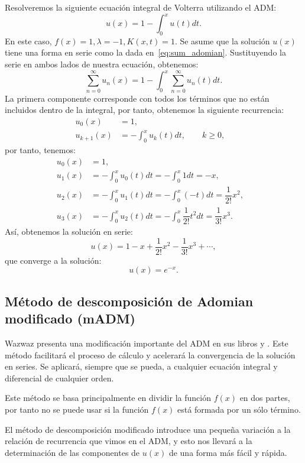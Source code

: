 \begin{ejemplo}
	Resolveremos la siguiente ecuación integral de Volterra utilizando el ADM:
	\begin{equation}
		u(x) = 1 - \int_{0}^{x} u(t)dt.
	\end{equation}
	En este caso, $f(x) = 1, \lambda = -1, K(x,t) = 1.$ Se asume que la solución $u(x)$ tiene una forma en serie como la dada en~\eqref{eq:sum_adomian}. Sustituyendo la serie en ambos lados de nuestra ecuación, obtenemos:
	\begin{equation}
		\sum_{n=0}^{\infty} u_n(x) = 1 - \int_{0}^{x} \sum_{n=0}^{\infty} u_n(t)dt.
	\end{equation}
	La primera componente corresponde con todos los términos que no están incluidos dentro de la integral, por tanto, obtenemos la siguiente recurrencia:
	\begin{align}
		u_0(x) &= 1,      &   \\
		u_{k+1}(x) &= - \int_{0}^{x} u_k(t)dt, \qquad k \geqslant 0,         & 
	\end{align}
	por tanto, tenemos:
	\begin{align}
		u_0(x) &= 1,      &   \\
		u_{1}(x) &= - \int_{0}^{x} u_0(t)dt = -\int_{0}^{x} 1dt = -x,    &  \\
		u_{2}(x) &= - \int_{0}^{x} u_1(t)dt = -\int_{0}^{x} (-t)dt = \dfrac{1}{2!}x^2,    &  \\
		u_{3}(x) &= - \int_{0}^{x} u_2(t)dt = -\int_{0}^{x} \dfrac{1}{2!}t^2dt = \dfrac{1}{3!}x^3.    & 
	\end{align}	
	Así, obtenemos la solución en serie:
	\begin{equation}
		u(x) = 1 - x + \dfrac{1}{2!}x^2 - \dfrac{1}{3!}x^3 + \cdots,
	\end{equation}
	que converge a la solución:
	\begin{equation}
		u(x) = e^{-x}.
	\end{equation}
\end{ejemplo}

\subsection{Método de descomposición de Adomian modificado (mADM)}
Wazwaz presenta una modificación importante del ADM en sus libros \cite{WazWaz1} y \cite{WazWaz2}. Este método facilitará el proceso de cálculo y acelerará la convergencia de la solución en series. Se aplicará, siempre que se pueda, a cualquier ecuación integral y diferencial de cualquier orden.
\begin{observacion}
	Este método se basa principalmente en dividir la función $f(x)$ en dos partes, por tanto no se puede usar si la función $f(x)$ está formada por un sólo término.
\end{observacion}
El método de descomposición modificado introduce una pequeña variación a la relación de recurrencia que vimos en el ADM, y esto nos llevará a la determinación de las componentes de $u(x)$ de una forma más fácil y rápida.

